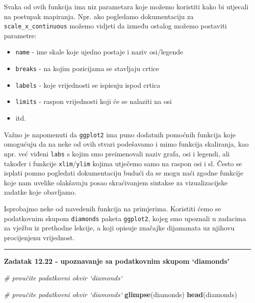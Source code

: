 \documentclass[]{book}
\newenvironment{Shaded}{\begin{snugshade}}{\end{snugshade}}
\newcommand{\KeywordTok}[1]{\textcolor[rgb]{0.13,0.29,0.53}{\textbf{#1}}}
\newcommand{\CommentTok}[1]{\textcolor[rgb]{0.56,0.35,0.01}{\textit{#1}}}
\newcommand{\NormalTok}[1]{#1}
\providecommand{\tightlist}{%
  \setlength{\itemsep}{0pt}\setlength{\parskip}{0pt}}
\theoremstyle{definition}
\theoremstyle{definition}
\theoremstyle{definition}
\theoremstyle{remark}
\begin{document}
Svaka od ovih funkcija ima niz parametara koje možemo koristiti kako bi
utjecali na postupak mapiranja. Npr. ako pogledamo dokumentaciju za
\texttt{scale\_x\_continuous} možemo vidjeti da između ostalog možemo
postaviti parametre:

\begin{itemize}
\tightlist
\item
  \texttt{name} - ime skale koje ujedno postaje i naziv osi/legende
\item
  \texttt{breaks} - na kojim pozicijama se stavljaju crtice
\item
  \texttt{labels} - koje vrijednosti se ispisuju ispod crtica
\item
  \texttt{limits} - raspon vrijednosti koji će se nalaziti na osi
\item
  itd.
\end{itemize}

Važno je napomenuti da \texttt{ggplot2} ima puno dodatnih pomoćnih
funkcija koje omogućuju da na neke od ovih stvari podešavamo i mimo
funkcija skaliranja, kao npr. već viđeni \texttt{labs} s kojim smo
preimenovali naziv grafa, osi i legendi, ali također i funkcije
\texttt{xlim}/\texttt{ylim} kojima utječemo samo na raspon osi i sl.
Često se isplati pomno pogledati dokumentaciju budući da se mogu naći
zgodne funkcije koje nam uvelike olakšavaju posao skraćivanjem sintakse
za vizualizacijske zadatke koje obavljamo.

Isprobajmo neke od navedenih funkcija na primjerima. Koristiti ćemo se
podatkovnim skupom \texttt{diamonds} paketa \texttt{ggplot2}, kojeg smo
upoznali u zadacima za vježbu iz prethodne lekcije, a koji opisuje
značajke dijamanata uz njihovu procijenjenu vrijednost.

\begin{center}\rule{0.5\linewidth}{\linethickness}\end{center}

\textbf{Zadatak 12.22 - upoznavanje sa podatkovnim skupom `diamonds'}

\begin{Shaded}
\begin{Highlighting}[]
\CommentTok{# proučite podatkovni okvir `diamonds`}
\end{Highlighting}
\end{Shaded}

\begin{Shaded}
\begin{Highlighting}[]
\CommentTok{# proučite podatkovni okvir `diamonds`}
\KeywordTok{glimpse}\NormalTok{(diamonds)}
\KeywordTok{head}\NormalTok{(diamonds)}
\end{Highlighting}
\end{Shaded}
\end{document}
